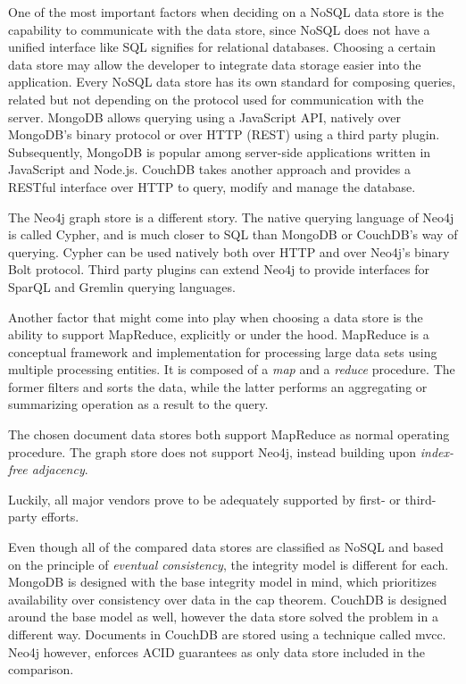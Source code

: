 One of the most important factors when deciding on a NoSQL data store is the capability to communicate with the data store, since NoSQL does not have a unified interface like SQL signifies for relational databases.
Choosing a certain data store may allow the developer to integrate data storage easier into the application.
Every NoSQL data store has its own standard for composing queries, related but not depending on the protocol used for communication with the server.
MongoDB allows querying using a JavaScript API, natively over MongoDB's binary protocol or over HTTP (REST) using a third party plugin.
Subsequently, MongoDB is popular among server-side applications written in JavaScript and Node.js.
CouchDB takes another approach and provides a RESTful interface over HTTP to query, modify and manage the database.

The Neo4j graph store is a different story.
The native querying language of Neo4j is called Cypher, and is much closer to SQL than MongoDB or CouchDB's way of querying.
Cypher can be used natively both over HTTP and over Neo4j's binary Bolt protocol.
Third party plugins can extend Neo4j to provide interfaces for SparQL and Gremlin querying languages.

Another factor that might come into play when choosing a data store is the ability to support MapReduce, explicitly or under the hood.
MapReduce is a conceptual framework and implementation for processing large data sets using multiple processing entities.
It is composed of a \textit{map} and a \textit{reduce} procedure.
The former filters and sorts the data, while the latter performs an aggregating or summarizing operation as a result to the query.

The chosen document data stores both support MapReduce as normal operating procedure.
The graph store does not support Neo4j, instead building upon \textit{index-free adjacency}.

Luckily, all major vendors prove to be adequately supported by first- or third-party efforts.

\begin{landscape}
  
\end{landscape}

Even though all of the compared data stores are classified as NoSQL and based on the principle of \textit{eventual consistency}, the integrity model is different for each.
MongoDB is designed with the \gls{base} integrity model in mind, which prioritizes availability over consistency over data in the \gls{cap} theorem.
CouchDB is designed around the \gls{base} model as well, however the data store solved the problem in a different way.
Documents in CouchDB are stored using a technique called \gls{mvcc}.
Neo4j however, enforces ACID guarantees as only data store included in the comparison.

